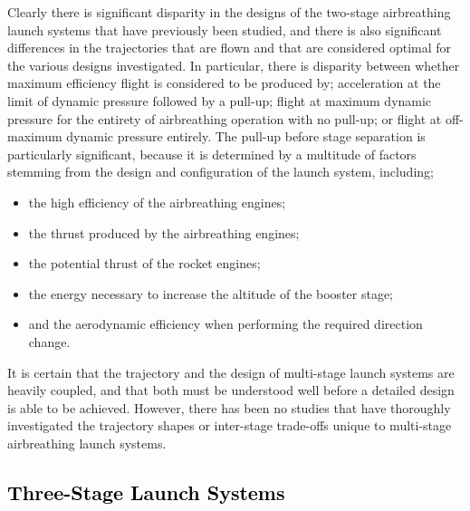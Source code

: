 Clearly there is significant disparity in the designs of the two-stage airbreathing launch systems that have previously been studied, and there is also significant differences in the trajectories that are flown and that are considered optimal for the various designs investigated.
In particular, there is disparity between whether maximum efficiency flight is considered to be produced by; acceleration at the limit of dynamic pressure followed by a pull-up; flight at maximum dynamic pressure for the entirety of airbreathing operation with no pull-up; or flight at off-maximum dynamic pressure entirely. The pull-up before stage separation is particularly significant, because it is determined by a multitude of factors stemming from the design and configuration of the launch system, including;
\begin{itemize}
	\item the high efficiency of the airbreathing engines;
	\item the thrust produced by the airbreathing engines;
	\item the potential thrust of the rocket engines;
	\item the energy necessary to increase the altitude of the booster stage;
	\item and the aerodynamic efficiency when performing the required direction change.
\end{itemize}
It is certain that the trajectory and the design of multi-stage launch systems are heavily coupled, and that both must be understood well before a detailed design is able to be achieved. However, there has been no studies that have thoroughly investigated the trajectory shapes or inter-stage trade-offs unique to multi-stage airbreathing launch systems. 



  \textcolor{black}{
  \subsection{Three-Stage Launch Systems}\label{sec:threestage}
}
	
